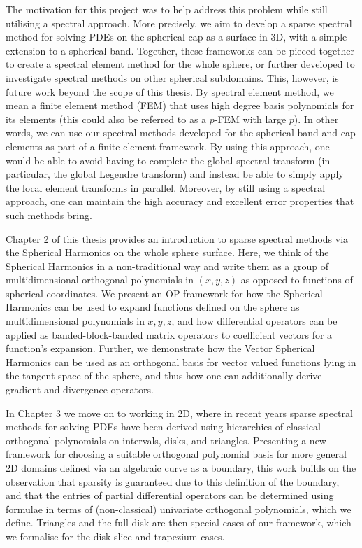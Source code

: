 The motivation for this project was to help address this problem while still utilising a spectral approach. More precisely, we aim to develop a sparse spectral method for solving PDEs on the spherical cap as a surface in 3D, with a simple extension to a spherical band. Together, these frameworks can be pieced together to create a spectral element method for the whole sphere, or further developed to investigate spectral methods on other spherical subdomains. This, however, is future work beyond the scope of this thesis. By spectral element method, we mean a finite element method (FEM) that uses high degree basis polynomials for its elements (this could also be referred to as a $p$-FEM with large $p$). In other words, we can use our spectral methods developed for the spherical band and cap elements as part of a finite element framework. By using this approach, one would be able to avoid having to complete the global spectral transform (in particular, the global Legendre transform) and instead be able to simply apply the local element transforms in parallel. Moreover, by still using a spectral approach, one can maintain the high accuracy and excellent error properties that such methods bring.

Chapter 2 of this thesis provides an introduction to sparse spectral methods via the Spherical Harmonics on the whole sphere surface. Here, we think of the Spherical Harmonics in a non-traditional way and write them as a group of multidimensional orthogonal polynomials in $(x,y,z)$ as opposed to functions of spherical coordinates. We present an OP framework for how the Spherical Harmonics can be used to expand functions defined on the sphere as multidimensional polynomials in $x, y, z$, and how differential operators can be applied as banded-block-banded matrix operators to coefficient vectors for a function's expansion. Further, we demonstrate how the Vector Spherical Harmonics can be used as an orthogonal basis for vector valued functions lying in the tangent space of the sphere, and thus how one can additionally derive gradient and divergence operators.

In Chapter 3 we move on to working in 2D, where in recent years sparse spectral methods for solving PDEs have been derived using hierarchies of classical orthogonal polynomials on intervals, disks, and triangles. Presenting a new framework for choosing a suitable orthogonal polynomial basis for more general 2D domains defined via an algebraic curve as a boundary, this work builds on the observation that sparsity is guaranteed due to this definition of the boundary, and that the entries of partial differential operators can be determined using formulae in terms of (non-classical) univariate orthogonal polynomials, which we define. Triangles and the full disk are then special cases of our framework, which we formalise for the disk-slice and trapezium cases.

